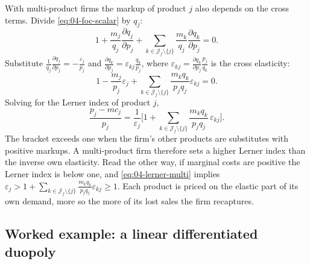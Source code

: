 With multi-product firms the markup of product $j$ also depends on the cross terms. Divide
\eqref{eq:04-foc-scalar} by $q_j$:
\begin{equation*}
1 + \frac{m_j}{q_j}\frac{\partial q_j}{\partial p_j} + \sum_{k \in \mathcal{J}_f\setminus\{j\}}\frac{m_k}{q_j}\frac{\partial q_k}{\partial p_j} = 0.
\end{equation*}
Substitute $\frac{1}{q_j}\frac{\partial q_j}{\partial p_j} = -\frac{\varepsilon_j}{p_j}$ and
$\frac{\partial q_k}{\partial p_j} = \varepsilon_{kj}\frac{q_k}{p_j}$, where
$\varepsilon_{kj} = \frac{\partial q_k}{\partial p_j}\frac{p_j}{q_k}$ is the cross elasticity:
\begin{equation*}
1 - \frac{m_j}{p_j}\varepsilon_j + \sum_{k \in \mathcal{J}_f\setminus\{j\}}\frac{m_kq_k}{p_jq_j}\varepsilon_{kj} = 0.
\end{equation*}
Solving for the Lerner index of product $j$,
\begin{equation}\label{eq:04-lerner-multi}
\frac{p_j - mc_j}{p_j} = \frac{1}{\varepsilon_j}\Bigg[1 + \sum_{k \in \mathcal{J}_f\setminus\{j\}}\frac{m_kq_k}{p_jq_j}\,\varepsilon_{kj}\Bigg].
\end{equation}
The bracket exceeds one when the firm's other products are substitutes with positive markups. A multi-product firm
therefore sets a higher Lerner index than the inverse own elasticity. Read the other way, if marginal costs are
positive the Lerner index is below one, and \eqref{eq:04-lerner-multi} implies
$\varepsilon_j > 1 + \sum_{k \in \mathcal{J}_f\setminus\{j\}}\frac{m_kq_k}{p_jq_j}\varepsilon_{kj} \ge 1$. Each product is priced on the elastic part
of its own demand, more so the more of its lost sales the firm recaptures.

\subsection{Worked example: a linear differentiated duopoly}\label{sec:04-bertrand-linear}

